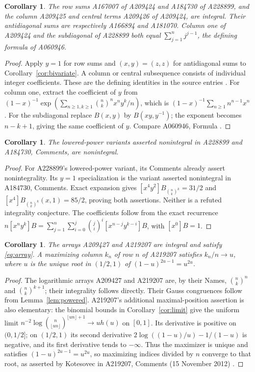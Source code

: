 \documentclass[11pt]{article}
\newtheorem{corollary}[theorem]{Corollary}
\begin{document}
\begin{corollary}\label{cor:rows}
The row sums A167007 of A209424 and A184730 of A228899, and the
column A209425 and central terms A209426 of A209424, are integral.
Their antidiagonal sums are respectively A166894 and A181070.
Column one of A209424 and the subdiagonal of A228899 both equal
$\sum_{j=1}^n j^{j-1}$, the defining formula of A060946.
\end{corollary}
\begin{proof}
Apply $y=1$ for row sums and $(x,y)=(z,z)$ for antidiagonal sums to
Corollary~\ref{cor:bivariate}. A column or central subsequence consists
of individual integer coefficients. These are the defining identities
in the source entries \cite{triangles,rows}.
For column one, extract the coefficient of $y$ from
$(1-x)^{-1}\exp(\sum_{n\ge1,k\ge1}\binom nk^nx^ny^k/n)$,
which is $(1-x)^{-1}\sum_{n\ge1}n^{n-1}x^n$.
For the subdiagonal replace $B(x,y)$ by $B(xy,y^{-1})$;
the exponent becomes $n-k+1$, giving the same coefficient of $y$.
Compare A060946, Formula \cite{trace}.
\end{proof}

\begin{corollary}\label{cor:lowered-triangles}
The lowered-power variants asserted nonintegral in A228899 and A184730,
Comments, are nonintegral.
\end{corollary}
\begin{proof}
For A228899's lowered-power variant, its Comments already assert
nonintegrality. Its $y=1$ specialization is the variant asserted
nonintegral in A184730, Comments. Exact expansion gives
$[x^4y^2]B_{\binom nk^k}=31/2$ and
$[x^4]B_{\binom nk^k}(x,1)=85/2$, proving both assertions.
Neither is a refuted integrality conjecture.
The coefficients follow from the exact recurrence
$n[x^ny^k]B=\sum_{j=1}^n\sum_{i=0}^j\binom ji^i
[x^{n-j}y^{k-i}]B$, with $[x^0]B=1$.
\end{proof}

\begin{corollary}\label{cor:arrays}
The arrays A209427 and A219207 are integral and satisfy
\eqref{eq:array}. A maximizing column $k_n$ of row $n$ of A219207 satisfies
$k_n/n\to u$, where $u$ is the unique root in $(1/2,1)$ of
$(1-u)^{2u-1}=u^{2u}$.
\end{corollary}
\begin{proof}
The logarithmic arrays A209427 and A219207 are, by their Names,
$\binom nk^n$ and $\binom nk^{k+1}$; their integrality follows
directly. Their Gauss congruences follow from Lemma~\ref{lem:powered}.
A219207's additional maximal-position assertion is also elementary:
the binomial bounds in Corollary~\ref{cor:limit} give the uniform limit
$n^{-2}\log\binom n{\lfloor un\rfloor}^{\lfloor un\rfloor+1}
\to u h(u)$ on $[0,1]$. Its derivative is positive on $(0,1/2]$;
on $(1/2,1)$ its second derivative
$2\log((1-u)/u)-1/(1-u)$ is negative, and its first derivative tends
to $-\infty$. Thus the maximizer is unique and satisfies
$(1-u)^{2u-1}=u^{2u}$, so maximizing indices divided by $n$
converge to that root, as asserted by Kotesovec in A219207, Comments
(15 November 2012) \cite{arrays}.
\end{proof}
\end{document}
